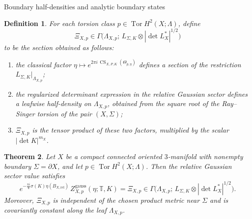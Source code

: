 \documentclass[12pt]{amsart}
\makeatletter
\renewcommand\subsection{\@startsection{subsection}{2}%
  \z@{.5\linespacing\@plus.7\linespacing}{-.5em}%
  {\normalfont\bfseries}}
\numberwithin{equation}{section}
\newtheorem{theorem}{Theorem}[section]
\newtheorem{definition}[theorem]{Definition}
\newcommand{\CS}{\operatorname{CS}}
\newcommand{\Tor}{\operatorname{Tor}}
\makeatother
\begin{document}
\subsection{Boundary half-densities and analytic boundary states}
\begin{definition}
\label{def:analytic-boundary-state}
For each torsion class \(p\in \Tor H^2(X;\Lambda)\), define
\[
\Xi_{X,p}
\in
\Gamma\!\bigl(
\Lambda_{X,p};\,L_{\Sigma,K}\otimes |\det L_X^*|^{1/2}
\bigr)
\]
to be the section obtained as follows:

\begin{enumerate}[label=(\roman*)]
\item the classical factor $\eta\longmapsto e^{2\pi i\,\CS_{X,P,K}(\Theta_{p,\eta})}$ defines a section of the restriction \(L_{\Sigma,K}|_{\Lambda_{X,p}}\);

\item the regularized determinant expression in the relative Gaussian sector defines a
leafwise half-density on \(\Lambda_{X,p}\), obtained from the square root of the
Ray--Singer torsion of the pair \((X,\Sigma)\);

\item \(\Xi_{X,p}\) is the tensor product of these two factors, multiplied by the scalar
\(|\det K|^{m_X}\).
\end{enumerate}
\end{definition}

\begin{theorem}
\label{cor:boundary-half-density-analytic}
Let \(X\) be a compact connected oriented \(3\)-manifold with nonempty boundary
\(\Sigma=\partial X\), and let \(p\in \Tor H^2(X;\Lambda)\). Then the relative Gaussian
sector value satisfies
\begin{equation}
\label{eq:boundary-half-density-analytic}
e^{-\frac{\pi i}{4}\sigma(K)\eta(B_{X,\mathrm{rel}})}
\,Z^{\mathrm{gauss}}_{X,p}(\eta;\mathbb T,K)
=
\Xi_{X,p}
\in
\Gamma\!\bigl(
\Lambda_{X,p};\,L_{\Sigma,K}\otimes |\det L_X^*|^{1/2}
\bigr).
\end{equation}
Moreover, \(\Xi_{X,p}\) is independent of the chosen product metric near \(\Sigma\) and is
covariantly constant along the leaf \(\Lambda_{X,p}\).
\end{theorem}
\end{document}
